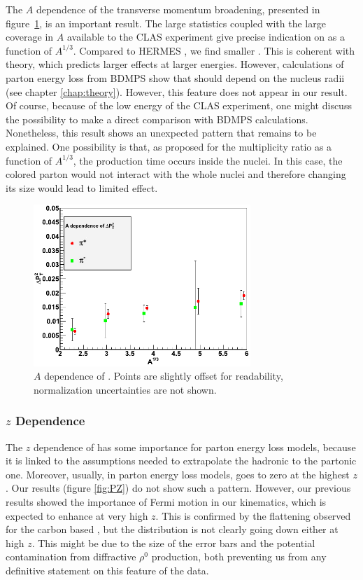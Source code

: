 The $A$ dependence of the transverse momentum broadening, presented in 
figure~\ref{fig:PA}, is an important result. The large statistics coupled with the 
large coverage in $A$ available to the CLAS experiment give precise indication on \dpt 
as a function of $A^{1/3}$. Compared to HERMES \cite{Airapetian:2009jy}, we
find smaller \dptp. This is coherent with theory, which predicts larger effects
at larger energies. However, calculations of parton energy loss from BDMPS 
\cite{Baier:1996sk} show that \pt should depend on the nucleus radii
(see chapter \ref{chap:theory}). However, this feature does not appear in our 
result. Of course, because of the low energy of the CLAS experiment, one might 
discuss the possibility to make a direct comparison with BDMPS calculations. Nonetheless, 
this result shows an unexpected pattern that remains to be explained. One 
possibility is that, as proposed for the multiplicity ratio as a function of 
$A^{1/3}$, the production time occurs inside the nuclei. In this case, the 
colored parton would not interact with the whole nuclei and therefore changing 
its size would lead to limited effect.

\begin{figure}[tbp]
\centering
\includegraphics[width=8.2cm] {chap6-fig/F_PvA.png} 
\caption {$A$ dependence of \dptp. Points are slightly offset for readability, normalization uncertainties are not shown.}
\label{fig:PA}
\end{figure}

\subsubsection{$z$ Dependence}

The $z$ dependence of \dpt has some importance for parton energy loss
models, because it is linked to the assumptions needed to extrapolate the hadronic \pt
to the partonic one. Moreover, usually, in parton energy loss models, \dpt
goes to zero at the highest $z$. Our results (figure \ref{fig:PZ}) do
not show such a pattern. However, our previous results showed the importance of 
Fermi motion in our kinematics, which is expected to enhance \dpt at very high
$z$. This is confirmed by the flattening observed for the carbon based \dptp, but
the distribution is not clearly going down either at high $z$. This might be due to the size of the 
error bars and the potential contamination from diffractive $\rho^0$ production, both 
preventing us from any definitive statement on this feature of the data.

